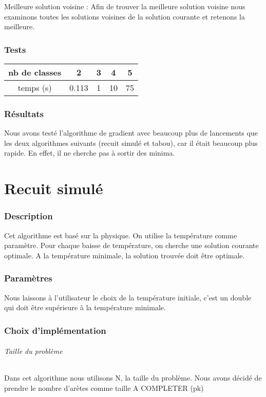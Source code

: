 \documentclass[12pt]{article}
\begin{document}
Meilleure solution voisine : Afin de trouver la meilleure solution voisine nous examinons toutes les solutions voisines de la solution courante et retenons la meilleure.

\section{Tests}

\begin{tabular}{|c|c|c|c|c|}
	\hline 
	nb de classes & 2 & 3 & 4 & 5 \\
	\hline
	temps (s) & 0.113 & 1 & 10 & 75 \\
	\hline
\end{tabular}

\section{Résultats}

Nous avons testé l’algorithme de gradient avec beaucoup plus de lancements que les deux algorithmes suivants (recuit simulé et tabou), car il était beaucoup plus rapide. En effet, il ne cherche pas à sortir des minima.

\newpage

\part{Recuit simulé}

\section{Description}
Cet algorithme est basé sur la physique. On utilise la température comme paramètre. Pour chaque baisse de température, on cherche une solution courante optimale. A la température minimale, la solution trouvée doit être optimale.

\section{Paramètres}
Nous laissons à l’utilisateur le choix de la température initiale, c’est un double qui doit être supérieure à la température minimale.

\section{Choix d'implémentation}

\paragraph{Taille du problème}
Dans cet algorithme nous utilisons N, la taille du problème. Nous avons décidé de prendre le nombre d’arètes comme taille  A COMPLETER (pk)
\end{document}
